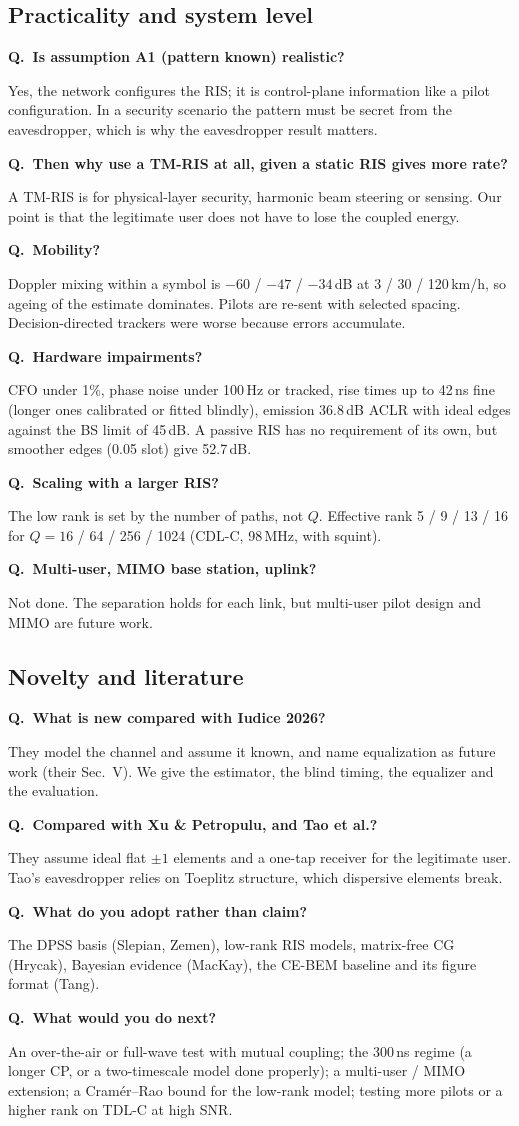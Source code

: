 \documentclass[11pt,a4paper]{article}
\newcounter{qn}
\newcommand{\Q}[1]{\stepcounter{qn}\par\medskip\noindent\textbf{Q\theqn.\ #1}\par\nopagebreak\noindent}
\begin{document}
\subsection{Practicality and system level}
\Q{Is assumption A1 (pattern known) realistic?}
Yes, the network configures the RIS; it is control-plane information like a pilot configuration. In a security scenario
the pattern must be secret from the eavesdropper, which is why the eavesdropper result matters.
\Q{Then why use a TM-RIS at all, given a static RIS gives more rate?}
A TM-RIS is for physical-layer security, harmonic beam steering or sensing. Our point is that the legitimate user does not
have to lose the coupled energy.
\Q{Mobility?}
Doppler mixing within a symbol is $-60$ / $-47$ / $-34$\,dB at 3 / 30 / 120\,km/h, so ageing of the estimate dominates.
Pilots are re-sent with selected spacing. Decision-directed trackers were worse because errors accumulate.
\Q{Hardware impairments?}
CFO under 1\%, phase noise under 100\,Hz or tracked, rise times up to 42\,ns fine (longer ones calibrated or fitted
blindly), emission 36.8\,dB ACLR with ideal edges against the BS limit of 45\,dB. A passive RIS has no requirement of its
own, but smoother edges (0.05 slot) give 52.7\,dB.
\Q{Scaling with a larger RIS?}
The low rank is set by the number of paths, not $Q$. Effective rank 5 / 9 / 13 / 16 for $Q=16$ / 64 / 256 / 1024 (CDL-C,
98\,MHz, with squint).
\Q{Multi-user, MIMO base station, uplink?}
Not done. The separation holds for each link, but multi-user pilot design and MIMO are future work.

\subsection{Novelty and literature}
\Q{What is new compared with Iudice 2026?}
They model the channel and assume it known, and name equalization as future work (their Sec.~V). We give the estimator,
the blind timing, the equalizer and the evaluation.
\Q{Compared with Xu \& Petropulu, and Tao et al.?}
They assume ideal flat $\pm1$ elements and a one-tap receiver for the legitimate user. Tao's eavesdropper relies on Toeplitz
structure, which dispersive elements break.
\Q{What do you adopt rather than claim?}
The DPSS basis (Slepian, Zemen), low-rank RIS models, matrix-free CG (Hrycak), Bayesian evidence (MacKay), the CE-BEM
baseline and its figure format (Tang).
\Q{What would you do next?}
An over-the-air or full-wave test with mutual coupling; the 300\,ns regime (a longer CP, or a two-timescale model done
properly); a multi-user / MIMO extension; a Cram\'er--Rao bound for the low-rank model; testing more pilots or a higher rank
on TDL-C at high SNR.
\end{document}
